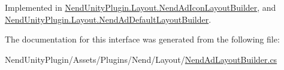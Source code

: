 Implemented in \hyperlink{class_nend_unity_plugin_1_1_layout_1_1_nend_ad_icon_layout_builder_ae559332c7cf96e21f2739954e97d9d6e}{Nend\+Unity\+Plugin.\+Layout.\+Nend\+Ad\+Icon\+Layout\+Builder}, and \hyperlink{class_nend_unity_plugin_1_1_layout_1_1_nend_ad_default_layout_builder_add1af990ca08ba1e4d1d1b87490940a4}{Nend\+Unity\+Plugin.\+Layout.\+Nend\+Ad\+Default\+Layout\+Builder}.



The documentation for this interface was generated from the following file\+:\begin{DoxyCompactItemize}
\item 
Nend\+Unity\+Plugin/\+Assets/\+Plugins/\+Nend/\+Layout/\hyperlink{_nend_ad_layout_builder_8cs}{Nend\+Ad\+Layout\+Builder.\+cs}\end{DoxyCompactItemize}
